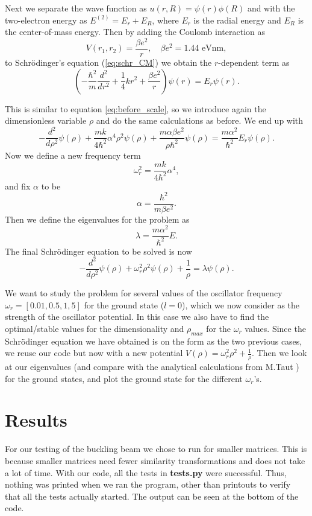 \documentclass[12pt,a4paper,english]{article}
\begin{document}
Next we separate the wave function as $u(r,R)=\psi(r)\phi(R)$ and with the two-electron energy as $E^{(2)}=E_r+E_R$, where $E_r$ is the radial energy and $E_R$ is the center-of-mass energy. Then by adding the Coulomb interaction as 
\[V(r_1,r_2)=\frac{\beta e^2}{r},\quad \beta e^2=1.44 \text{ eVnm},\]
to Schrödinger's equation (\ref{eq:schr_CM}) we obtain the $r$-dependent term as
\begin{equation}
\label{eq:shcr_split_2}
\left(-\frac{\hbar^2}{m}\frac{d^2}{dr^2}+\frac{1}{4}kr^2+\frac{\beta e^2}{r}\right)\psi(r)=E_r\psi(r).
\end{equation}

This is similar to equation \ref{eq:before_scale}, so we introduce again the dimensionless variable $\rho$ and do the same calculations as before. We end up with 
\begin{equation}
\label{eq:before_alpha_2}
-\frac{d^2}{d\rho^2}\psi(\rho)+\frac{mk}{4\hbar^2}\alpha^4\rho^2\psi(\rho)+\frac{m\alpha\beta e^2}{\rho\hbar^2}\psi(\rho)=\frac{m\alpha^2}{\hbar^2}E_r\psi(\rho).
\end{equation}
Now we define a new frequency term
\[\omega_r^2=\frac{mk}{4\hbar^2}\alpha^4,\]
and fix $\alpha$ to be
\[\alpha=\frac{\hbar^2}{m\beta e^2}.\]
Then we define the eigenvalues for the problem as 
\begin{equation}
\label{eq:eigenval_2}
\lambda=\frac{m\alpha^2}{\hbar^2}E.
\end{equation}
The final Schrödinger equation to be solved is now
\begin{equation}
\label{eq:final_schr_2}
-\frac{d^2}{d\rho^2}\psi(\rho)+\omega_r^2\rho^2\psi(\rho)+\frac{1}{\rho}=\lambda\psi(\rho).
\end{equation}

We want to study the problem for several values of the oscillator frequency\\ $\omega_r=[0.01, 0.5, 1, 5]$ for the ground state ($l=0$), which we now consider as the strength of the oscillator potential. In this case we also have to find the optimal/stable values for the dimensionality and $\rho_{max}$ for the $\omega_r$ values. Since the Schrödinger equation we have obtained is on the form as the two previous cases, we reuse our code but now with a new potential $V(\rho)=\omega_r^2\rho^2+\frac{1}{\rho}$. Then we look at our eigenvalues (and compare with the analytical calculations from M.Taut \cite{analytiv_eigval}) for the ground states, and plot the ground state for the different $\omega_r$'s.

\section{Results}
For our testing of the buckling beam we chose to run for smaller matrices. This is because smaller matrices need fewer similarity transformations and does not take a lot of time. With our code, all the tests in \textbf{tests.py} were successful. Thus, nothing was printed when we ran the program, other than printouts to verify that all the tests actually started. The output can be seen at the bottom of the code.
\end{document}
